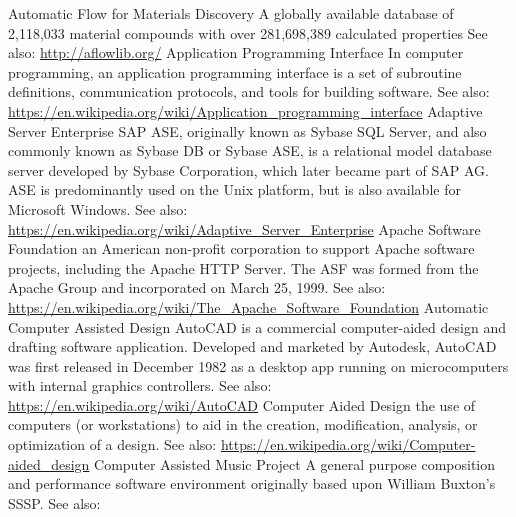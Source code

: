 	{Automatic Flow for Materials Discovery}
	{A globally available database of 2,118,033 material compounds with over 281,698,389 calculated properties See also: \url{http://aflowlib.org/}}
	{Application Programming Interface}
	{In computer programming, an application programming interface is a set of subroutine definitions, communication protocols, and tools for building software.  See also: \url{https://en.wikipedia.org/wiki/Application_programming_interface}}
	{Adaptive Server Enterprise}
	{SAP ASE, originally known as Sybase SQL Server, and also commonly known as Sybase DB or Sybase ASE, is a relational model database server developed by Sybase Corporation, which later became part of SAP AG. ASE is predominantly used on the Unix platform, but is also available for Microsoft Windows. See also: \url{https://en.wikipedia.org/wiki/Adaptive_Server_Enterprise}}
	{Apache Software Foundation}
	{an American non-profit corporation to support Apache software projects, including the Apache HTTP Server. The ASF was formed from the Apache Group and incorporated on March 25, 1999. See also: \url{https://en.wikipedia.org/wiki/The_Apache_Software_Foundation}}
	{Automatic Computer Assisted Design}
	{AutoCAD is a commercial computer-aided design and drafting software application. Developed and marketed by Autodesk, AutoCAD was first released in December 1982 as a desktop app running on microcomputers with internal graphics controllers. See also: \url{https://en.wikipedia.org/wiki/AutoCAD}}
	{Computer Aided Design}
	{the use of computers (or workstations) to aid in the creation, modification, analysis, or optimization of a design. See also: \url{https://en.wikipedia.org/wiki/Computer-aided_design}}
	{Computer Assisted Music Project}
	{A general purpose composition and performance software environment originally based upon William Buxton's SSSP. See also: \url{} \cite{DBLP:conf/icmc/FreeV88}}
